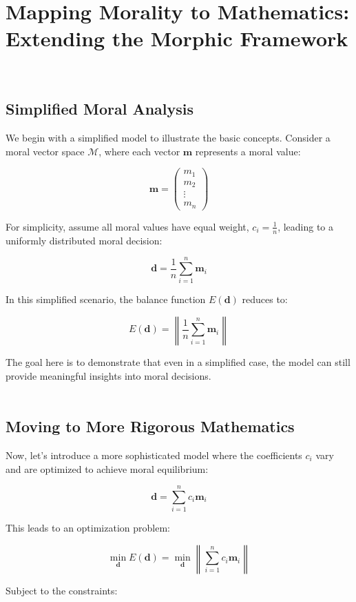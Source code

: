 \documentclass{article}
\begin{document}
\section{Mapping Morality to Mathematics: Extending the Morphic Framework}
\

\subsection{Simplified Moral Analysis}

We begin with a simplified model to illustrate the basic concepts. Consider a moral vector space \( \mathcal{M} \), where each vector \( \mathbf{m} \) represents a moral value:

\[
\mathbf{m} = \begin{pmatrix}
m_1 \\
m_2 \\
\vdots \\
m_n
\end{pmatrix}
\]

For simplicity, assume all moral values have equal weight, \( c_i = \frac{1}{n} \), leading to a uniformly distributed moral decision:

\[
\mathbf{d} = \frac{1}{n} \sum_{i=1}^{n} \mathbf{m}_i
\]

In this simplified scenario, the balance function \( E(\mathbf{d}) \) reduces to:

\[
E(\mathbf{d}) = \left\lVert \frac{1}{n} \sum_{i=1}^{n} \mathbf{m}_i \right\rVert
\]

The goal here is to demonstrate that even in a simplified case, the model can still provide meaningful insights into moral decisions.
\\
\\


\subsection{Moving to More Rigorous Mathematics}

Now, let's introduce a more sophisticated model where the coefficients \( c_i \) vary and are optimized to achieve moral equilibrium:

\[
\mathbf{d} = \sum_{i=1}^{n} c_i \mathbf{m}_i
\]

This leads to an optimization problem:

\[
\min_{\mathbf{d}} E(\mathbf{d}) = \min_{\mathbf{d}} \left\lVert \sum_{i=1}^{n} c_i \mathbf{m}_i \right\rVert
\]

Subject to the constraints:
\end{document}
